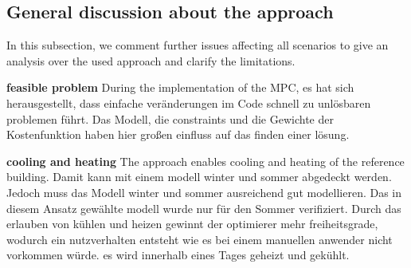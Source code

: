\subsection{General discussion about the approach}
\label{subsec:General discussion about the approach}
In this subsection, we comment further issues affecting all scenarios to give an analysis over the used approach and clarify the limitations.\newline

\textbf{feasible problem}\newline
During the implementation of the MPC, es hat sich herausgestellt, dass einfache veränderungen im Code schnell zu unlösbaren problemen führt. Das Modell, die constraints und die Gewichte der Kostenfunktion haben hier großen einfluss auf das finden einer lösung.

\textbf{cooling and heating}\newline
The approach enables cooling and heating of the reference building. Damit kann mit einem modell winter und sommer abgedeckt werden. Jedoch muss das Modell winter und sommer ausreichend gut modellieren. Das in diesem Ansatz gewählte modell wurde nur für den Sommer verifiziert. Durch das erlauben von kühlen und heizen gewinnt der optimierer mehr freiheitsgrade, wodurch ein nutzverhalten entsteht wie es bei einem manuellen anwender nicht vorkommen würde. es wird innerhalb eines Tages geheizt und gekühlt. 
%

